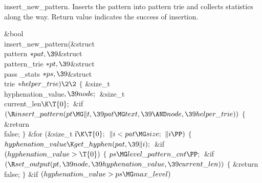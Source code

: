 insert\_new\_pattern.
Inserts the pattern into pattern trie and collects statistics along the way.
Return value indicates the success of
insertion.

\Y\B\1\1\&{bool} \\{insert\_new\_pattern}(\&{struct} \\{pattern} ${}{*}\\{pat},%
\39{}$\&{struct} \\{pattern\_trie} ${}{*}\\{pt},\39{}$\&{struct} \\{pass%
\_stats} ${}{*}\\{ps},\39{}$\&{struct} \\{trie} ${}{*}\\{helper\_trie})\2\2{}$\6
${}\{{}$\1\6
\&{size\_t} \\{hyphenation\_value}${},\39\\{node};{}$\6
\&{size\_t} \\{current\_len}${}\K\T{0};{}$\7
\&{if} ${}(\R\\{insert\_pattern}(\\{pt}\MG\|t,\39\\{pat}\MG\\{text},\39{\AND}%
\\{node},\39\\{helper\_trie})){}$\5
${}\{{}$\1\6
\&{return} \\{false};\6
\4${}\}{}$\2\6
\&{for} (\&{size\_t} \|i${}\K\T{0};{}$ ${}\|i<\\{pat}\MG\\{size};{}$ ${}\|i%
\PP){}$\5
${}\{{}$\1\6
${}\\{hyphenation\_value}\K\\{get\_hyphen}(\\{pat},\39\|i);{}$\6
\&{if} ${}(\\{hyphenation\_value}>\T{0}){}$\5
${}\{{}$\1\6
${}\\{ps}\MG\\{level\_pattern\_cnt}\PP;{}$\6
\&{if} ${}(\R\\{set\_output}(\\{pt},\39\\{node},\39\\{hyphenation\_value},\39%
\\{current\_len})){}$\5
${}\{{}$\1\6
\&{return} \\{false};\6
\4${}\}{}$\2\6
\&{if} ${}(\\{hyphenation\_value}>\\{ps}\MG\\{max\_level}){}$\5
